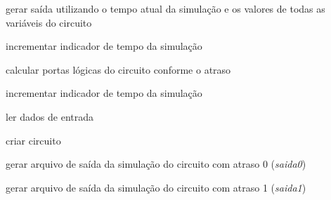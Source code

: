 \begin{algorithm}[ht]
{{{{                    gerar saída utilizando o tempo atual da simulação e os valores de todas as variáveis do circuito
                }

                \BlankLine

                incrementar indicador de tempo da simulação

                \BlankLine

            }

            \BlankLine


            {
                calcular portas lógicas do circuito conforme o atraso 

                incrementar indicador de tempo da simulação
            }

        }
        
    }
            
    \BlankLine

    \BlankLine


    \BlankLine

    {    
        ler dados de entrada

        criar circuito

        \BlankLine
        

        gerar arquivo de saída da simulação do circuito com atraso 0 (\textit{saida0}) 

        \BlankLine

        
        gerar arquivo de saída da simulação do circuito com atraso 1 (\textit{saida1}) 
    } 

\end{algorithm}